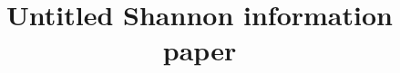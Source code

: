 



\title{Untitled Shannon information paper}
\date{\vspace{-10ex}}


\usepackage{fontenc}
\usepackage{graphicx}
\usepackage{kpfonts,baskervald}
\graphicspath{{img/}}

\usepackage[
	a4paper,
	total={6in, 8in}
]{geometry}
\renewcommand{\baselinestretch}{1.5} %
\setlength{\voffset}{-0.75in} %
\setlength{\textheight}{700pt}
\setlength{\marginparwidth}{0pt}

\usepackage{mathptmx}
\usepackage{mathtools} %
\usepackage{amsmath}
\usepackage{hyperref}

\usepackage{makecell} %
\renewcommand{\cellalign}{cl} %



\usepackage{doi}
\usepackage[style=authoryear-comp,
		backend=bibtex,
		isbn=false,
		natbib=true,
    uniquelist=false, %
    maxcitenames=2] %
		{biblatex}





